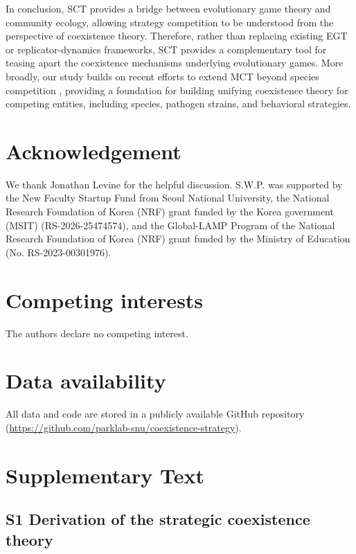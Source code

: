 \documentclass[12pt]{article}
\begin{document}
In conclusion, SCT provides a bridge between evolutionary game theory and community ecology, allowing strategy competition to be understood from the perspective of coexistence theory. 
Therefore, rather than replacing existing EGT or replicator-dynamics frameworks, SCT provides a complementary tool for teasing apart the coexistence mechanisms underlying evolutionary games.
More broadly, our study builds on recent efforts to extend MCT beyond species competition \citep{park2024predicting,park2026unifying}, providing a foundation for building unifying coexistence theory for competing entities, including species, pathogen strains, and behavioral strategies.

\section*{Acknowledgement}

We thank Jonathan Levine for the helpful discussion.
S.W.P. was supported by the New Faculty Startup Fund from Seoul National University,
the National Research Foundation of Korea (NRF) grant funded by the Korea government (MSIT) (RS-2026-25474574),
and the Global-LAMP Program of the National Research Foundation of Korea (NRF) grant funded by the Ministry of Education (No. RS-2023-00301976).

\section*{Competing interests}

The authors declare no competing interest.

\section*{Data availability}

All data and code are stored in a publicly available GitHub repository (\url{https://github.com/parklab-snu/coexistence-strategy}).

\pagebreak

\renewcommand\theequation{S\arabic{equation}}    
\setcounter{equation}{0}

\section*{Supplementary Text}

\subsection*{S1 Derivation of the strategic coexistence theory}
\end{document}
